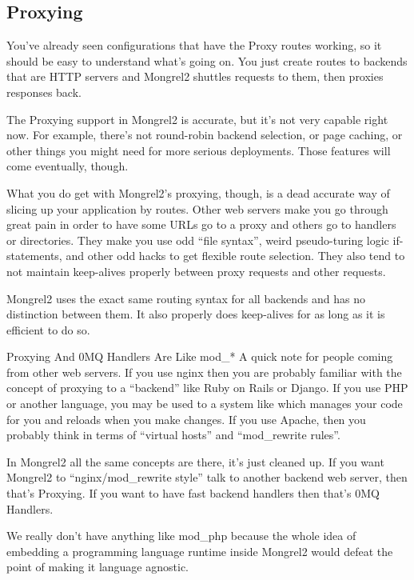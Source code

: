 \subsection{Proxying}

You've already seen configurations that have the Proxy routes working, so it should
be easy to understand what's going on.  You just create routes to backends that are
HTTP servers and Mongrel2 shuttles requests to them, then proxies responses back.

The Proxying support in Mongrel2 is accurate, but it's not very capable right now.  For
example, there's not round-robin backend selection, or page caching, or other things you
might need for more serious deployments.  Those features will come eventually, though.

What you do get with Mongrel2's proxying, though, is a dead accurate way of slicing up
your application by routes.  Other web servers make you go through great pain in order
to have some URLs go to a proxy and others go to handlers or directories.  They make you
use odd ``file syntax'', weird pseudo-turing logic if-statements, and other odd hacks
to get flexible route selection.  They also tend to not maintain keep-alives properly
between proxy requests and other requests.

Mongrel2 uses the exact same routing syntax for all backends and has no distinction between
them.  It also properly does keep-alives for as long as it is efficient to do so.

\begin{aside}{Proxying And 0MQ Handlers Are Like mod\_*}
A quick note for people coming from other web servers.  If you use nginx then you are probably
familiar with the concept of proxying to a ``backend'' like Ruby on Rails or Django.
If you use PHP or another language, you may be used to a system like  which 
manages your code for you and reloads when you make changes.
If you use Apache, then you probably think in terms of ``virtual hosts'' and ``mod\_rewrite rules''.

In Mongrel2 all the same concepts are there, it's just cleaned up.  If you want Mongrel2
to ``nginx/mod\_rewrite style'' talk to another backend web server, then that's Proxying.
If you want to have fast backend handlers then that's 0MQ Handlers.

We really don't have anything like mod\_php because the whole idea of embedding a programming
language runtime inside Mongrel2 would defeat the point of making it language agnostic.
\end{aside}


